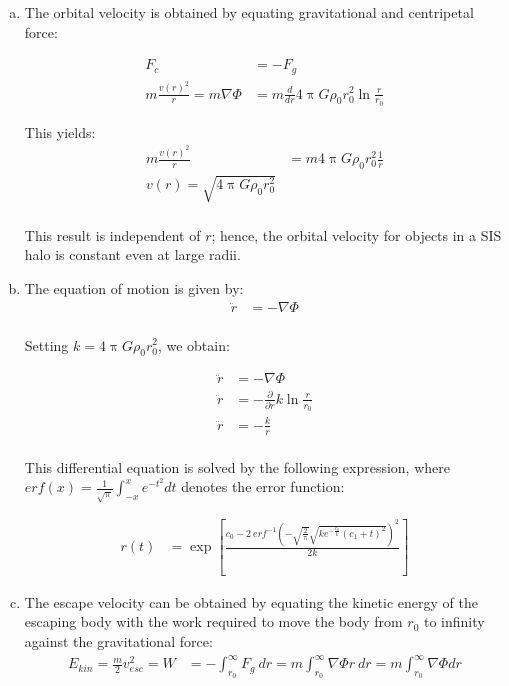 \documentclass[a4paper,12pt]{article}
\renewcommand{\pi}{\uppi}
\begin{document}
\begin{enumerate}
\begin{enumerate}[(a)]
			
			\item The orbital velocity is obtained by equating gravitational and centripetal force: 
			
			\begin{align*}
			F_c &= - F_g \\
			m \frac{v(r)^2}{r} = m \nabla \Phi &= m \frac{d}{dr} 4 \pi G \rho_0r_0^2 \ln \frac{r}{r_0}
			\end{align*}
			
			This yields: 
			\begin{align*}
			m \frac{v(r)^2}{r} &= m 4 \pi G \rho_0 r_0^2 \frac{1}{r}\\
			v(r) = \sqrt{4 \pi G \rho_0 r_0^2} \\
			\end{align*}
			
			This result is independent of $r$; hence, the orbital velocity for objects in a SIS halo is constant even 				at large radii.
			
			\item The equation of motion is given by:
			\begin{align*}
			\ddot{r} &= - \nabla \Phi \\
			\end{align*}

			Setting $k = 4 \pi G \rho_0 r_0^2$, we obtain:
			
			\begin{align*}
			\ddot{r} &= - \nabla \Phi \\
			\ddot{r} &= - \frac{\partial}{\partial r} k \ln \frac{r}{r_0} \\
			\ddot{r} &= - \frac{k}{r} \\
			\end{align*}

			This differential equation is solved by the following expression, where $erf(x) = \frac{1}{\sqrt{\pi}} \int_{-x}^{x} e^{-t^2}dt$ denotes the error function: 
			
			\begin{align*}
			r(t) &= \exp\left[\frac{c_0 - 2 \ erf^{-1}\left(-\sqrt{\frac{2}{\pi}} \sqrt{k e^{-\frac{c_0}{k}}(c_1 + t)^2}\right)^2}{2 k}\right]
			\end{align*}
			
			\item The escape velocity can be obtained by equating the kinetic energy of the escaping body with the work required to move the body from $r_0$ to infinity against the gravitational force: 
			\begin{align*}
			E_{kin} = \frac{m}{2} v_{esc}^2 = W &= - \int_{r_0}^{\infty} F_g \ dr = m \int_{r_0}^{\infty} \nabla \Phi  r \ dr = m \int_{r_0}^{\infty} \nabla \Phi dr 
			\end{align*}
			

\end{enumerate}
\end{enumerate}
\end{document}
